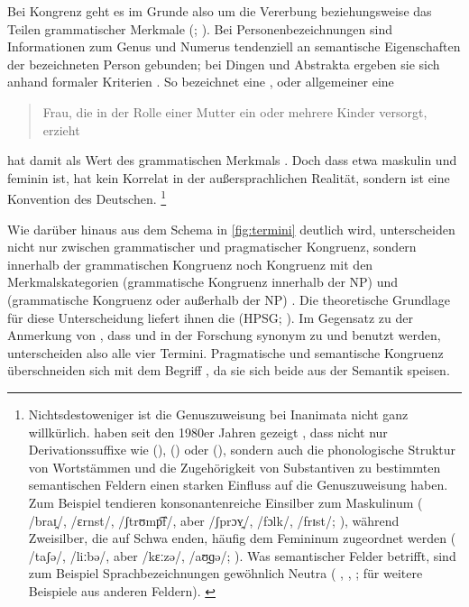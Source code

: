 Bei Kongrenz geht es im Grunde also um die Vererbung beziehungsweise das Teilen
grammatischer Merkmale (; \cite{corbett2012}). Bei
Personenbezeichnungen sind Informationen zum Genus und Numerus tendenziell an
semantische Eigenschaften der bezeichneten Person gebunden; bei Dingen und
Abstrakta ergeben sie sich anhand formaler Kriterien \autocites[vgl.][2--4,
125--132]{corbett2006}{koepckezubin2017}. So bezeichnet  eine
, oder allgemeiner
eine \blockcquote[\pno~]{duden-online}{Frau, die in der Rolle einer
Mutter ein oder mehrere Kinder versorgt, erzieht}.  hat damit
 als Wert des grammatischen Merkmals .
Doch dass etwa  maskulin und  feminin ist, hat kein Korrelat
in der außersprachlichen Realität, sondern ist eine Konvention des Deutschen.%
%
	\footnote{Nichtsdestoweniger ist die Genuszuweisung bei Inanimata nicht
		ganz willkürlich. \citeauthor{koepckezubin2017} haben seit den 1980er
		Jahren gezeigt
		\autocites[z.\,B.][]%
			{koepcke1982}%
			{koepckezubin1996}%
			{koepckezubin2009}%
			{koepckezubin2017},
		dass nicht nur Derivationssuffixe wie
			 (\M),
			 (\F) oder
			 (\N),
		sondern auch die phonologische Struktur von Wortstämmen und die
		Zugehörigkeit von Substantiven zu bestimmten semantischen Feldern einen
		starken Einfluss auf die Genuszuweisung haben. Zum Beispiel tendieren
		konsonantenreiche Einsilber zum Maskulinum (%
			 /braɪ̯/,
			 /ɛrnst/,
			 /ʃtrʊmp͡f/, aber
			 /ʃprɔʏ̯/,
			 /fɔlk/,
			 /frɪst/;
		\cite[vgl.][475--479]{koepckezubin1996}), während Zweisilber, die auf
		Schwa enden, häufig dem Femininum zugeordnet werden (%
			 /taʃə/,
			 /liːbə/, aber
			 /kɛːzə/,
			 /aʊ̯ɡə/;
		\cite[vgl.][207--209]{koepckezubin2017}). Was semantischer Felder
		betrifft, sind zum Beispiel Sprachbezeichnungen gewöhnlich Neutra (%
			,
			,
			;
		\cites[vgl.]%
			[480]{koepckezubin1996}%
			[137--139]{koepckezubin2009}%
			[210--214]{koepckezubin2017}
		für weitere Beispiele aus anderen Feldern).%
		\label{fn:koepckezubin}
	}

Wie darüber hinaus aus dem Schema in \cref{fig:termini} deutlich wird,
unterscheiden \citet{wechslerzlatic2003} nicht nur zwischen grammatischer und
pragmatischer Kongruenz, sondern innerhalb der grammatischen Kongruenz noch
Kongruenz mit den Merkmalskategorien \Concord{} (grammatische Kongruenz  innerhalb der NP) und \Index{} (grammatische Kongruenz 
oder  außerhalb der NP) \citep[8--17]{wechslerzlatic2003}. Die
theoretische Grundlage für diese Unterscheidung liefert ihnen die
 (HPSG; \cite{pollardsag1994}). Im
Gegensatz zu der Anmerkung von \citet[164]{fleischer2012}, dass  und
 in der Forschung synonym zu  und
 benutzt werden, unterscheiden \citet{wechslerzlatic2003} also
alle vier Termini. Pragmatische und semantische Kongruenz überschneiden sich
mit dem Begriff , da sie sich beide aus der Semantik
speisen.

